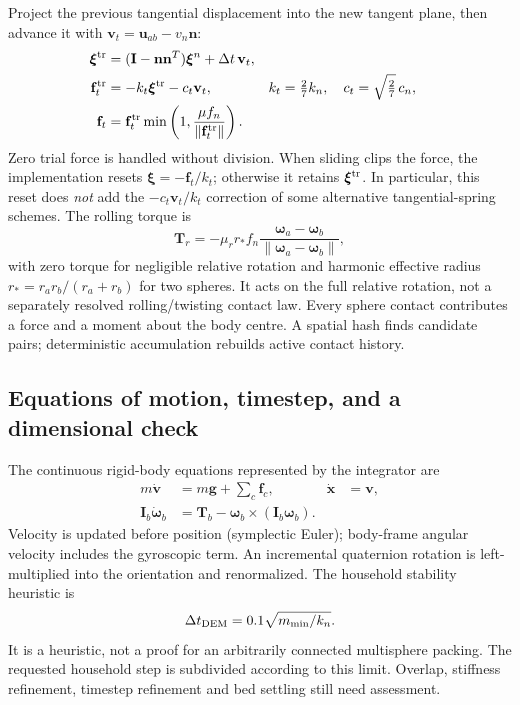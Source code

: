Project the previous tangential displacement into the new tangent plane,
then advance it with $\mathbf{v}_t=\mathbf{u}_{ab}-v_n\mathbf{n}$:
\begin{align}
 \boldsymbol\xi^{\rm tr}
 &= (\mathbf{I}-\mathbf{n}\mathbf{n}^{T})\boldsymbol\xi^n
       +\Delta t\,\mathbf{v}_t,\\
 \mathbf{f}_t^{\rm tr}&=-k_t\boldsymbol\xi^{\rm tr}-c_t\mathbf{v}_t,
 &k_t&=\tfrac27 k_n,\quad c_t=\sqrt{\tfrac27}\,c_n,\\
 \mathbf{f}_t&=\mathbf{f}_t^{\rm tr}
       \min\left(1,\frac{\mu f_n}{\|\mathbf{f}_t^{\rm tr}\|}\right).
 \label{eq:tangent-contact}
\end{align}
Zero trial force is handled without division. When sliding clips the force,
the implementation resets $\boldsymbol\xi=-\mathbf{f}_t/k_t$; otherwise it retains
$\boldsymbol\xi^{\rm tr}$. In particular, this reset does \emph{not} add the
$-c_t\mathbf{v}_t/k_t$ correction of some alternative tangential-spring schemes.
The rolling torque is
\begin{equation}
 \mathbf{T}_r=-\mu_r r_* f_n
 \frac{\boldsymbol\omega_a-\boldsymbol\omega_b}
      {\|\boldsymbol\omega_a-\boldsymbol\omega_b\|}, \label{eq:rolling}
\end{equation}
with zero torque for negligible relative rotation and harmonic effective radius
$r_*=r_ar_b/(r_a+r_b)$ for two spheres. It acts on the full relative rotation,
not a separately resolved rolling/twisting contact law. Every sphere contact
contributes a force and a moment about the body centre. A spatial hash finds
candidate pairs; deterministic accumulation rebuilds active contact history.

\subsection{Equations of motion, timestep, and a dimensional check}
The continuous rigid-body equations represented by the integrator are
\begin{align}
 m\dot{\mathbf{v}}&=m\mathbf{g}+\sum_c\mathbf{f}_c, &
 \dot{\mathbf{x}}&=\mathbf{v},\\
 \mathbf{I}_b\dot{\boldsymbol\omega}_b
 &=\mathbf{T}_b-\boldsymbol\omega_b\times(\mathbf{I}_b\boldsymbol\omega_b).
\end{align}
Velocity is updated before position (symplectic Euler); body-frame angular
velocity includes the gyroscopic term. An incremental quaternion rotation is
left-multiplied into the orientation and renormalized. The household stability
heuristic is
\begin{equation}
 \Delta t_{\rm DEM}=0.1\sqrt{m_{\min}/k_n}. \label{eq:dem-step}
\end{equation}
It is a heuristic, not a proof for an arbitrarily connected multisphere packing.
The requested household step is subdivided according to this limit. Overlap,
stiffness refinement, timestep refinement and bed settling still need assessment.

